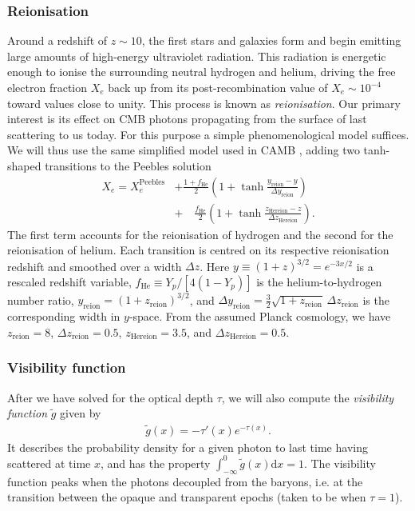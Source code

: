 \documentclass[twocolumn]{aa}
\renewcommand{\d}{\text{d}}
\begin{document}
\subsubsection{Reionisation}

Around a redshift of $z \sim 10$, the first stars and galaxies form and begin emitting large amounts of high-energy ultraviolet radiation. This radiation is energetic enough to ionise the surrounding neutral hydrogen and helium, driving the free electron fraction $X_e$ back up from its post-recombination value of $X_e \sim 10^{-4}$ toward values close to unity. This process is known as \textit{reionisation}. Our primary interest is its effect on CMB photons propagating from the surface of last scattering to us today. For this purpose a simple phenomenological model suffices. We will thus use the same simplified model used in CAMB \citet{Lewis:1999bs}, adding two tanh-shaped transitions to the Peebles solution
\begin{align}
      X_e = X_e^{\mathrm{Peebles}} &+ \frac{1+f_{\mathrm{He}}}{2}\left(1+\tanh\frac{y_{\mathrm{reion}}-y}{\Delta y_{\mathrm{reion}}}\right) \nonumber\\
                                    &+\quad \frac{f_{\mathrm{He}}}{2}\left(1 + \tanh \frac{z_{\mathrm{Hereion}}-z}{\Delta z_{\mathrm{Hereion}}}\right).\label{eq:reionisation}
\end{align}
The first term accounts for the reionisation of hydrogen and the second for the reionisation of helium. Each transition is centred on its respective reionisation redshift and smoothed over a width $\Delta z$. Here $y \equiv (1+z)^{3/2} = e^{-3x/2}$ is a rescaled redshift variable, $f_{\mathrm{He}} \equiv Y_p / [4(1-Y_p)]$ is the helium-to-hydrogen number ratio, $y_{\mathrm{reion}} = (1+z_{\mathrm{reion}})^{3/2}$, and $\Delta y_{\mathrm{reion}} = \tfrac{3}{2}\sqrt{1+z_{\mathrm{reion}}}\,\Delta z_{\mathrm{reion}}$ is the corresponding width in $y$-space. From the assumed Planck cosmology, we have $z_\text{reion}=8$, $\Delta z_\text{reion}=0.5$, $z_\text{Hereion}=3.5$, and $\Delta z_\text{Hereion}=0.5$. 

\subsubsection{Visibility function}
After we have solved for the optical depth $\tau$, we will also compute the \textit{visibility function} $\tilde{g}$ given by 
\begin{align}
      \tilde{g}(x) = -\tau'(x)e^{-\tau(x)}.\label{eq:visibility function}
\end{align}
It describes the probability density for a given photon to last time having scattered at time $x$, and has the property $\int_{-\infty}^0 \tilde{g}(x)\d x = 1$. The visibility function peaks when the photons decoupled from the baryons, i.e. at the transition between the opaque and transparent epochs (taken to be when $\tau = 1$). 
\end{document}
